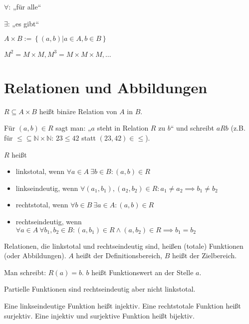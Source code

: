 \begin{notation}[Allquantor]
  $\forall$: „für alle“
\end{notation}
\begin{notation}[Existenzquantor]
  $\exists$: „es gibt“
\end{notation}

\begin{definition}
  $A \times B := \left\{ (a, b) | a \in A, b \in B \right\}$
\end{definition}
\begin{remark}
  $M^2 = M \times M, M^3 = M \times M \times M, \dots$
\end{remark}

\section{Relationen und Abbildungen}

\begin{definition}[Relation]
  $R \subseteq A \times B$ heißt binäre Relation von $A$ in $B$.
\end{definition}
\begin{notation}
  Für $(a, b) \in R$ sagt man: „$a$ steht in Relation $R$ zu $b$“ und schreibt $a R b$ (z.B. für $\le \subseteq \mathbb{N} \times \mathbb{N}$: $23 \le 42$ statt $(23,42) \in \le$).
\end{notation}

\begin{definition}
  $R$ heißt
  \begin{itemize}
  \item linkstotal, wenn $\forall a \in A\: \exists b \in B: (a, b) \in R$
  \item linkseindeutig, wenn $\forall (a_1, b_1), (a_2, b_2) \in R: a_1 \ne a_2 \implies b_1 \ne b_2$
  \item rechtstotal, wenn $\forall b \in B\: \exists a \in A: (a, b) \in R$
  \item rechtseindeutig, wenn $\forall a \in A\: \forall b_1, b_2 \in B: (a, b_1) \in R \wedge (a, b_2) \in R \implies b_1 = b_2$
  \end{itemize}
\end{definition}
\begin{definition}[Funktion]
  Relationen, die linkstotal und rechtseindeutig sind, heißen (totale) Funktionen (oder Abbildungen). $A$ heißt der Definitionsbereich, $B$ heißt der Zielbereich.

  Man schreibt: $R(a) = b$. $b$ heißt Funktionswert an der Stelle $a$.

  Partielle Funktionen sind rechtseindeutig aber nicht linkstotal.

  Eine linkseindeutige Funktion heißt injektiv. Eine rechtstotale Funktion heißt surjektiv. Eine injektiv und surjektive Funktion heißt bijektiv.
\end{definition}

